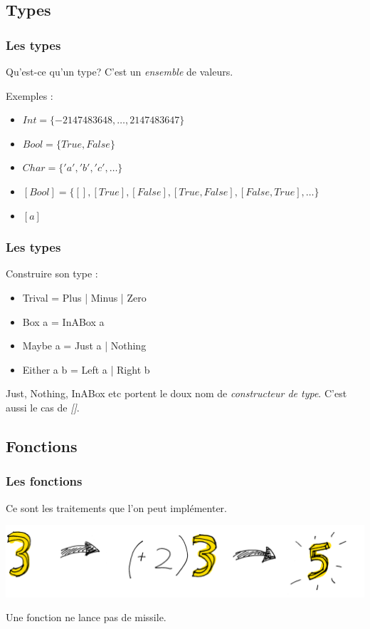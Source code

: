 \documentclass{beamer}
\begin{document}
\subsection{Types}
\begin{frame}
\frametitle{Les types}
\begin{block}{Qu'est-ce qu'un type?}
C'est un \emph{ensemble} de valeurs.
\end{block}
\pause
\begin{exampleblock}{Exemples :}
\begin{itemize}
\item $Int = \{-2 147 483 648, \dots, 2 147 483 647\}$
\item $Bool = \{True, False\}$
\item $Char = \{'a', 'b', 'c' , \dots\}$
\pause
\item $[Bool] = \{[], [True], [False], [True, False], [False, True], \dots\}$
\pause
\item $[a]$
\end{itemize}

\end{exampleblock}
\end{frame}

\begin{frame}
\frametitle{Les types}
\begin{block}{Construire son type :}
\begin{itemize}
\item Trival = Plus | Minus | Zero
\pause
\item Box a = InABox a
\pause
\item Maybe a = Just a | Nothing
\pause
\item Either a b = Left a | Right b
\end{itemize}
\end{block}

\pause

Just, Nothing, InABox etc portent le doux nom de \emph{constructeur de type}. C'est aussi le cas de \emph{[]}.
\end{frame}

\subsection{Fonctions}
\begin{frame}
\frametitle{Les fonctions}
\begin{block}{}
Ce sont les traitements que l'on peut implémenter.
\end{block}
\begin{center}
\includegraphics[scale=0.2]{fct.png}
\end{center}
\pause
\begin{block}{}
Une fonction ne lance pas de missile.
\end{block}
\end{frame}
\end{document}
